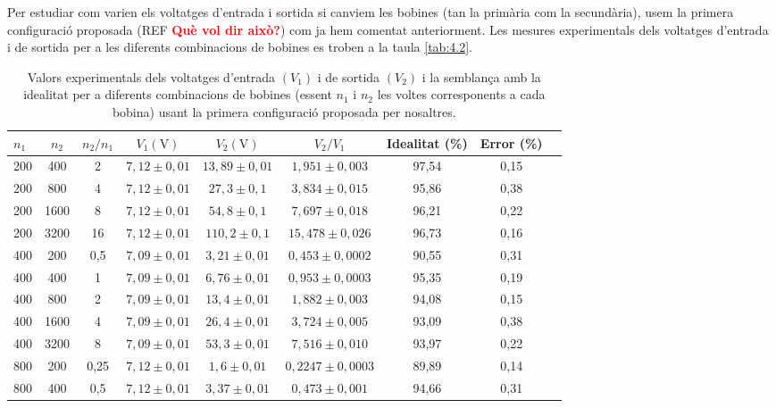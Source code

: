 \documentclass[a4paper,10.5pt]{report}
\begin{document}
Per estudiar com varien els voltatges d'entrada i sortida si canviem les bobines (tan la primària com la secundària), usem la primera configuració proposada (REF \textbf{\textcolor{red}{Què vol dir això?}}) com ja hem comentat anteriorment. Les mesures experimentals dels voltatges d'entrada i de sortida per a les diferents combinacions de bobines es troben a la taula \ref{tab:4.2}. 
\begin{table}[H]
	\centering
	\renewcommand{\arraystretch}{1.2}
	\caption{Valors experimentals dels voltatges d'entrada $(V_1)$ i de sortida $(V_2)$ i la semblança amb la idealitat per a diferents combinacions de bobines (essent $n_1$ i $n_2$ les voltes corresponents a cada bobina) usant la primera configuració proposada per nosaltres.}
	\begin{tabular}{lcccccccc}
		\toprule
		$n_1$ & $n_2$ & $n_2/n_1$ & $V_1 (\text{V})$ & $V_2 (\text{V})$ & $V_2/V_1$ & Idealitat (\%) & Error (\%) \\
		\midrule
		200 & 400 & 2 & $7{,}12 \pm 0{,}01$ & $13{,}89 \pm 0{,}01$ & $1{,}951 \pm 0{,}003$ & 97,54 & 0,15 \\
		200 & 800 & 4 & $7{,}12 \pm 0{,}01$ & $27{,}3 \pm 0{,}1$ & $3{,}834 \pm 0{,}015$ & 95,86 & 0,38 \\
		200 & 1600 & 8 & $7{,}12 \pm 0{,}01$ & $54{,}8 \pm 0{,}1$ & $7{,}697 \pm 0{,}018$ & 96,21 & 0,22 \\
		200 & 3200 & 16 & $7{,}12 \pm 0{,}01$ & $110{,}2 \pm 0{,}1$ & $15{,}478 \pm 0{,}026$ & 96,73 & 0,16 \\
		\midrule
		400 & 200 & 0{,}5 & $7{,}09 \pm 0{,}01$ & $3{,}21 \pm 0{,}01$ & $0{,}453 \pm 0{,}0002$ & 90,55 & 0,31 \\
		400 & 400 & 1 & $7{,}09 \pm 0{,}01$ & $6{,}76 \pm 0{,}01$ & $0{,}953 \pm 0{,}0003$ & 95,35 & 0,19 \\
		400 & 800 & 2 & $7{,}09 \pm 0{,}01$ & $13{,}4 \pm 0{,}01$ & $1{,}882 \pm 0{,}003$ & 94,08 & 0,15 \\
		400 & 1600 & 4 & $7{,}09 \pm 0{,}01$ & $26{,}4 \pm 0{,}01$ & $3{,}724 \pm 0{,}005$ & 93,09 & 0,38 \\
		400 & 3200 & 8 & $7{,}09 \pm 0{,}01$ & $53{,}3 \pm 0{,}01$ & $7{,}516 \pm 0{,}010$ & 93,97 & 0,22 \\
		\midrule
		800 & 200 & 0{,}25 & $7{,}12 \pm 0{,}01$ & $1{,}6 \pm 0{,}01$ & $0{,}2247 \pm 0{,}0003$ & 89,89 & 0,14 \\
		800 & 400 & 0{,}5 & $7{,}12 \pm 0{,}01$ & $3{,}37 \pm 0{,}01$ & $0{,}473 \pm 0{,}001$ & 94,66 & 0,31 \\

\end{tabular}
\end{table}
\end{document}
